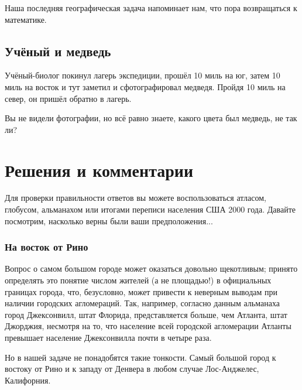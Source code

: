 \documentclass[twoside]{book}
\makeatletter
\newcommand{\rindex}[2][\imki@jobname]{%
  \index[#1]{\detokenize{#2}}%
}
\makeatother
\begin{document}
\medskip

Наша последняя географическая задача напоминает нам, что пора возвращаться к математике. %

\subsection*{Учёный и медведь}%
\rindex{Учёный и медведь}

Учёный-биолог покинул лагерь экспедиции, прошёл 10 миль на юг, затем 10 миль на восток и тут заметил и сфотографировал медведя.
Пройдя 10 миль на север, он пришёл обратно в лагерь.

\medskip

Вы не видели фотографии, но всё равно знаете, какого цвета был медведь, не так ли?



\section*{Решения и комментарии}

Для проверки правильности ответов вы можете воспользоваться атласом, глобусом, альманахом или итогами переписи населения США 2000 года.
Давайте посмотрим, насколько верны были ваши предположения...

\subsubsection*{На восток от Рино}%

Вопрос о самом большом городе может оказаться довольно щекотливым; 
принято определять это понятие числом жителей (а не площадью!) в официальных границах города, что, безусловно, может привести к неверным выводам
при наличии городских агломераций.
Так, например, согласно данным альманаха город Джексонвилл, штат Флорида, представляется больше, чем Атланта, штат Джорджия, несмотря на то, что население всей городской агломерации Атланты превышает население Джексонвилла почти в четыре раза.

\medskip

Но в нашей задаче не понадобятся такие тонкости.
Самый большой город к востоку от Рино и к западу от Денвера в любом случае Лос-Анджелес, Калифорния.
\heart
\end{document}

